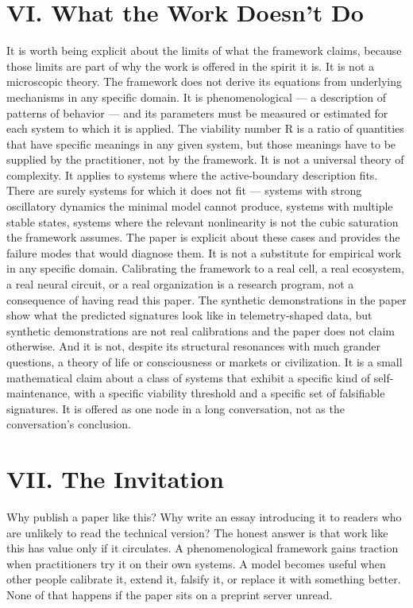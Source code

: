 \documentclass[12pt]{article}
\begin{document}
\section*{VI. What the Work Doesn't Do}

It is worth being explicit about the limits of what the framework claims, because those limits are part of why the work is offered in the spirit it is. It is not a microscopic theory. The framework does not derive its equations from underlying mechanisms in any specific domain. It is phenomenological --- a description of patterns of behavior --- and its parameters must be measured or estimated for each system to which it is applied. The viability number R is a ratio of quantities that have specific meanings in any given system, but those meanings have to be supplied by the practitioner, not by the framework. It is not a universal theory of complexity. It applies to systems where the active-boundary description fits. There are surely systems for which it does not fit --- systems with strong oscillatory dynamics the minimal model cannot produce, systems with multiple stable states, systems where the relevant nonlinearity is not the cubic saturation the framework assumes. The paper is explicit about these cases and provides the failure modes that would diagnose them. It is not a substitute for empirical work in any specific domain. Calibrating the framework to a real cell, a real ecosystem, a real neural circuit, or a real organization is a research program, not a consequence of having read this paper. The synthetic demonstrations in the paper show what the predicted signatures look like in telemetry-shaped data, but synthetic demonstrations are not real calibrations and the paper does not claim otherwise. And it is not, despite its structural resonances with much grander questions, a theory of life or consciousness or markets or civilization. It is a small mathematical claim about a class of systems that exhibit a specific kind of self-maintenance, with a specific viability threshold and a specific set of falsifiable signatures. It is offered as one node in a long conversation, not as the conversation's conclusion.


\section*{VII. The Invitation}

Why publish a paper like this? Why write an essay introducing it to readers who are unlikely to read the technical version? The honest answer is that work like this has value only if it circulates. A phenomenological framework gains traction when practitioners try it on their own systems. A model becomes useful when other people calibrate it, extend it, falsify it, or replace it with something better. None of that happens if the paper sits on a preprint server unread.
\end{document}

